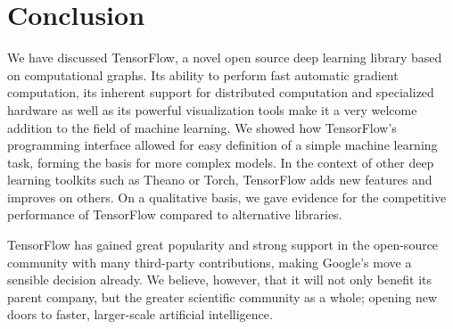 \section{Conclusion}\label{sec:conclusion}

We have discussed TensorFlow, a novel open source deep learning library based on
computational graphs. Its ability to perform fast automatic gradient
computation, its inherent support for distributed computation and specialized
hardware as well as its powerful visualization tools make it a very welcome
addition to the field of machine learning. We showed how TensorFlow's
programming interface allowed for easy definition of a simple machine learning
task, forming the basis for more complex models. In the context of other deep
learning toolkits such as Theano or Torch, TensorFlow adds new features and
improves on others. On a qualitative basis, we gave evidence for the competitive
performance of TensorFlow compared to alternative libraries.

TensorFlow has gained great popularity and strong support in the open-source
community with many third-party contributions, making Google's move a sensible
decision already. We believe, however, that it will not only benefit its parent
company, but the greater scientific community as a whole; opening new doors to
faster, larger-scale artificial intelligence.

